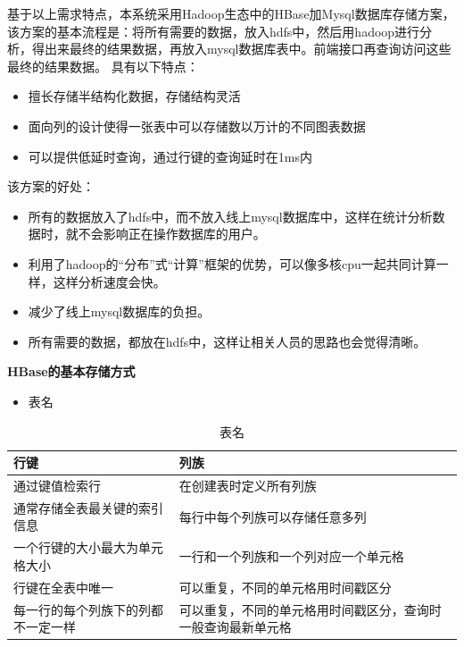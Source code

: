 基于以上需求特点，本系统采用Hadoop生态中的HBase加Mysql数据库存储方案，该方案的基本流程是：将所有需要的数据，放入hdfs中，然后用hadoop进行分析，得出来最终的结果数据，再放入mysql数据库表中。前端接口再查询访问这些最终的结果数据。
具有以下特点：
\begin{itemize}
	\item 擅长存储半结构化数据，存储结构灵活
	\item 面向列的设计使得一张表中可以存储数以万计的不同图表数据
	\item 可以提供低延时查询，通过行键的查询延时在1ms内
\end{itemize}

该方案的好处：
\begin{itemize}
	\item 所有的数据放入了hdfs中，而不放入线上mysql数据库中，这样在统计分析数据时，就不会影响正在操作数据库的用户。
	\item 利用了hadoop的“分布”式“计算”框架的优势，可以像多核cpu一起共同计算一样，这样分析速度会快。
	\item 减少了线上mysql数据库的负担。
	\item 所有需要的数据，都放在hdfs中，这样让相关人员的思路也会觉得清晰。
\end{itemize}

\newpage
\textbf{HBase的基本存储方式}
\begin{itemize}
\item 表名
\end{itemize}

\begin{table}[!htbp]
	\centering
	\caption{表名}
	\label{tab:my-table}
	\begin{tabular}{|p{3cm}|p{10cm}|}
		\hline
		\rowcolor[HTML]{DAE8FC} 
		行键 & 列族 \\ \hline
		通过键值检索行 & 在创建表时定义所有列族  \\ \hline
		通常存储全表最关键的索引信息 & 每行中每个列族可以存储任意多列 \\ \hline
		一个行键的大小最大为单元格大小 & 一行和一个列族和一个列对应一个单元格 \\ \hline
        行键在全表中唯一 & 可以重复，不同的单元格用时间戳区分 \\ \hline
        每一行的每个列族下的列都不一定一样 & 可以重复，不同的单元格用时间戳区分，查询时一般查询最新单元格 \\ \hline
	\end{tabular}
\end{table}




